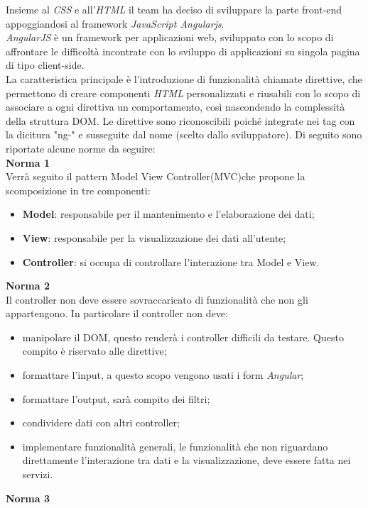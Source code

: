 Insieme al \textit{CSS} e all'\textit{HTML} il team ha deciso di sviluppare la parte front-end appoggiandosi al framework \textit{JavaScript Angularjs}\glossario.\\
\textit{AngularJS} è un framework per applicazioni web, sviluppato con lo scopo di affrontare le difficoltà incontrate con lo sviluppo di applicazioni su singola pagina di tipo client-side.\-\\
La caratteristica principale è l'introduzione di funzionalità chiamate direttive, che permettono di creare componenti \textit{HTML} personalizzati e riusabili con lo scopo di associare a ogni direttiva un comportamento, così nascondendo la complessità della struttura DOM\glossario. Le direttive sono riconoscibili poiché integrate nei tag con la dicitura "ng-" e susseguite dal nome (scelto dallo sviluppatore). 
Di seguito sono riportate alcune norme da seguire:\\
\textbf{Norma 1}\\
Verrà seguito il pattern Model View Controller(MVC)\glossario che propone la scomposizione in tre componenti:
\begin{itemize}
	\item \textbf{Model}: responsabile per il mantenimento e l'elaborazione dei dati;
	\item \textbf{View}: responsabile per la visualizzazione dei dati all'utente;
	\item \textbf{Controller}: si occupa di controllare l'interazione tra Model e View.
\end{itemize} 
\textbf{Norma 2}\\
Il controller non deve essere sovraccaricato di funzionalità che non gli appartengono. In particolare il controller non deve:
\begin{itemize}
	\item manipolare il DOM, questo renderà i controller difficili da testare. Questo compito è riservato alle direttive;
	\item formattare l'input, a questo scopo vengono usati i form \textit{Angular};
	\item formattare l'output, sarà compito dei filtri;
	\item condividere dati con altri controller;
	\item implementare funzionalità generali, le funzionalità che non riguardano direttamente l'interazione tra dati e la visualizzazione, deve essere fatta nei servizi.
\end{itemize}
\textbf{Norma 3}\\

